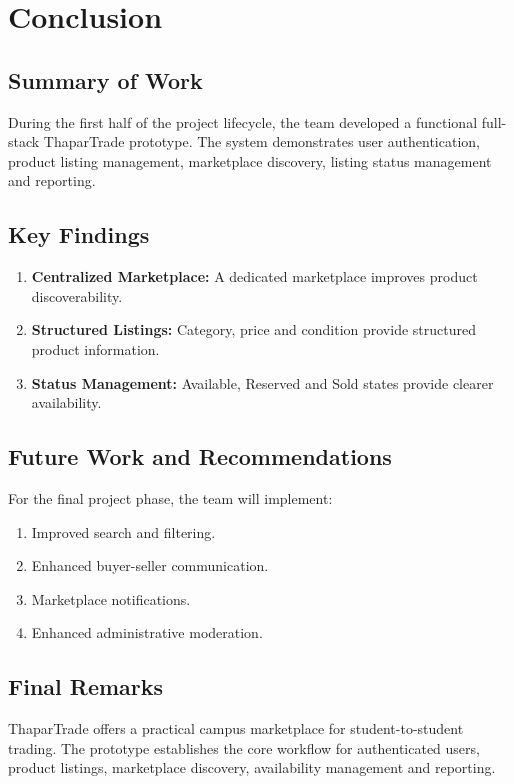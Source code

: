 \documentclass[12pt,a4paper,oneside]{report}
\begin{document}

\chapter{Conclusion}

\section{Summary of Work}

During the first half of the project lifecycle, the team developed a
functional full-stack ThaparTrade prototype. The system demonstrates
user authentication, product listing management, marketplace
discovery, listing status management and reporting.

\section{Key Findings}

\begin{enumerate}

\item \textbf{Centralized Marketplace:}
A dedicated marketplace improves product discoverability.

\item \textbf{Structured Listings:}
Category, price and condition provide structured product information.

\item \textbf{Status Management:}
Available, Reserved and Sold states provide clearer availability.

\end{enumerate}

\section{Future Work and Recommendations}

For the final project phase, the team will implement:

\begin{enumerate}

\item Improved search and filtering.

\item Enhanced buyer-seller communication.

\item Marketplace notifications.

\item Enhanced administrative moderation.

\end{enumerate}

\section{Final Remarks}

ThaparTrade offers a practical campus marketplace for student-to-student
trading. The prototype establishes the core workflow for authenticated
users, product listings, marketplace discovery, availability management
and reporting.
\end{document}
